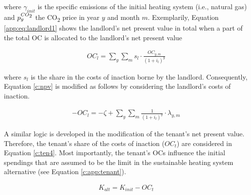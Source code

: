 \documentclass[review]{elsarticle}
\begin{document}
where $\gamma_{init}$ is the specific emissions of the initial heating system (i.e., natural gas) and $p_{y}^{CO\textsubscript{2}}$ the CO\textsubscript{2} price in year $y$ and month $m$. Exemplarily, Equation \ref{app:eq:landlord1} shows the landlord's net present value in total when a part of the total OC is allocated to the landlord's net present value

\begin{align}\label{app:eq:landlord1}
	OC_{l} =  \sum_{y} \sum_{m} s_l \cdot \frac{OC_{y,m}}{(1+i_l)^y} 
\end{align}

where $s_l$ is the share in the costs of inaction borne by the landlord. Consequently, Equation \ref{c:npv} is modified as follows by considering the landlord's costs of inaction.

\begin{align}\label{app:eq:landlord}
	-OC_{l} =  -\zeta + \sum_{y} \sum_{m} \frac{1}{(1+i_l)^y} \cdot \lambda_{y,m}
\end{align}

A similar logic is developed in the modification of the tenant's net present value. Therefore, the tenant's share of the costs of inaction ($OC_{t}$) are considered in Equation \ref{c:ten4}. Most importantly, the tenant's OCs influence the initial spendings that are assumed to be the limit in the sustainable heating system alternative (see Equation \ref{c:app:tenant}).

\begin{align}\label{c:app:tenant}
	K_{alt} = K_{init} - OC_{t}
\end{align}
\end{document}
